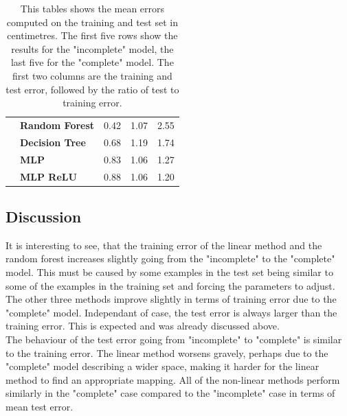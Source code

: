 \begin{table}[]
\begin{tabular}{l|l|l|l|l|}
\textbf{}           & \textbf{Random Forest} & 0.42                                                                 & 1.07                                                             & 2.55                                                                \\ \cline{2-5}
\textbf{}           & \textbf{Decision Tree} & 0.68                                                                 & 1.19                                                             & 1.74                                                                \\ \cline{2-5}
\textbf{}           & \textbf{MLP}           & 0.83                                                                 & 1.06                                                             & 1.27                                                                \\ \cline{2-5}
\textbf{}           & \textbf{MLP ReLU}      & 0.88                                                                 & 1.06                                                             & 1.20                                                                \\ \cline{2-5}
\end{tabular}
\caption[Learnt mapping results]{This tables shows the mean errors computed on the training and test set in centimetres. The first five rows show the results for the "incomplete" model, the last five for the "complete" model. The first two columns are the training and test error, followed by the ratio of test to training error.}
\label{tableMapping}
\end{table}

\subsection{Discussion}
It is interesting to see, that the training error of the linear method and the random forest increases slightly going from the "incomplete" to the "complete" model. This must be caused by some examples in the test set being similar to some of the examples in the training set and forcing the parameters to adjust. The other three methods improve slightly in terms of training error due to the "complete" model. Independant of case, the test error is always larger than the training error. This is expected and was already discussed above.\\

The behaviour of the test error going from "incomplete" to "complete" is similar to the training error. The linear method worsens gravely, perhaps due to the "complete" model describing a wider space, making it harder for the linear method to find an appropriate mapping. All of the non-linear methods perform similarly in the "complete" case compared to the "incomplete" case in terms of mean test error.\\

